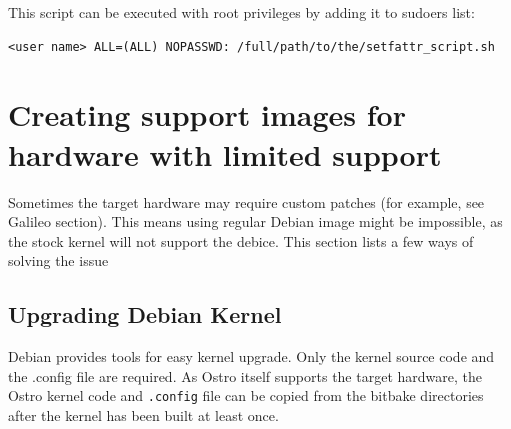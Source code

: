 \documentclass[a4paper,11pt]{article}
\newcommand{\cmd}[1]{\texttt{#1}}
\begin{document}
This script can be executed with root privileges by adding it to sudoers list:

\begin{lstlisting}
<user name> ALL=(ALL) NOPASSWD: /full/path/to/the/setfattr_script.sh
\end{lstlisting}

\section{Creating support images for hardware with limited support}

Sometimes the target hardware may require custom patches (for example, see Galileo section). This means using regular Debian image might be impossible, as the stock kernel will not support the debice. This section lists a few ways of solving the issue

\subsection*{Upgrading Debian Kernel}

Debian provides tools for easy kernel upgrade. Only the kernel source code and the .config file are required. As Ostro itself supports the target hardware, the Ostro kernel code and \cmd{.config} file can be copied from the bitbake directories after the kernel has been built at least once. 
\end{document}
